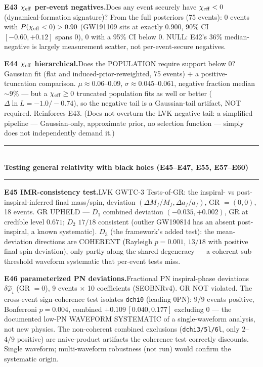 \documentclass[10pt]{article}
\newcommand{\entry}[2]{\vspace{5pt}\noindent\textbf{#1}\quad #2\par}
\newcommand{\grouphead}[1]{\vspace{9pt}\noindent\rule{\linewidth}{0.4pt}\\[-2pt]{\small\textbf{#1}}\\[-4pt]\rule{\linewidth}{0.4pt}\par\vspace{2pt}}
\begin{document}
\entry{E43 $\chi_{\rm eff}$ per-event negatives.}{Does any event securely have $\chi_{\rm eff}<0$
(dynamical-formation signature)? From the full posteriors (75 events): $0$ events with
$P(\chi_{\rm eff}<0)>0.90$ (GW191109 sits at exactly $0.900$, 90\% CI $[-0.60,+0.12]$ spans 0),
$0$ with a 95\% CI below 0. NULL: E42's $36\%$ median-negative is largely measurement scatter, not
per-event-secure negatives.}

\entry{E44 $\chi_{\rm eff}$ hierarchical.}{Does the POPULATION require support below 0? Gaussian
fit (flat and induced-prior-reweighted, 75 events) $+$ a positive-truncation comparison. $\mu\approx
0.06$--$0.09$, $\sigma\approx0.045$--$0.061$, negative fraction median $\sim9\%$ --- but a
$\chi_{\rm eff}\ge0$ truncated population fits as well or better ($\Delta\ln L=-1.0/-0.74$), so the
negative tail is a Gaussian-tail artifact, NOT required. Reinforces E43. (Does not overturn the
LVK negative tail: a simplified pipeline --- Gaussian-only, approximate prior, no selection
function --- simply does not independently demand it.)}

\grouphead{Testing general relativity with black holes (E45--E47, E55, E57--E60)}

\entry{E45 IMR-consistency test.}{LVK GWTC-3 Tests-of-GR: the inspiral- vs post-inspiral-inferred
final mass/spin, deviation $(\Delta M_f/M_f,\Delta a_f/a_f)$, GR $=(0,0)$, 18 events. GR UPHELD ---
$D_1$ combined deviation $(-0.035,+0.002)$, GR at credible level $0.671$; $D_2$ $17/18$ consistent
(outlier GW190814 has an absent post-inspiral, a known systematic). $D_3$ (the framework's added
test): the mean-deviation directions are COHERENT (Rayleigh $p=0.001$, $13/18$ with positive
final-spin deviation), only partly along the shared degeneracy --- a coherent sub-threshold
waveform systematic that per-event tests miss.}

\entry{E46 parameterized PN deviations.}{Fractional PN inspiral-phase deviations
$\delta\hat\varphi_i$ (GR $=0$), 9 events $\times$ 10 coefficients (SEOBNRv4). GR NOT violated. The
cross-event sign-coherence test isolates \texttt{dchi0} (leading 0PN): $9/9$ events positive,
Bonferroni $p=0.004$, combined $+0.109\,[0.040,0.177]$ excluding 0 --- the documented low-PN
WAVEFORM SYSTEMATIC of a single-waveform analysis, not new physics. The non-coherent combined
exclusions (\texttt{dchi3/5l/6l}, only $2$--$4/9$ positive) are naive-product artifacts the
coherence test correctly discounts. Single waveform; multi-waveform robustness (not run) would
confirm the systematic origin.}
\end{document}
